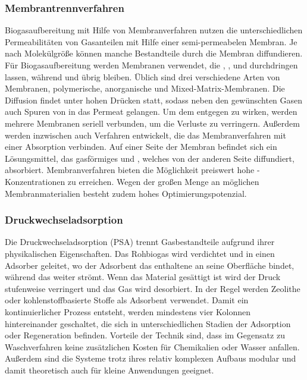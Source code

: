 \subsubsection{Membrantrennverfahren}\label{chap:membrane} 

Biogasaufbereitung mit Hilfe von Membranverfahren nutzen die unterschiedlichen Permeabilitäten von Gasanteilen mit Hilfe einer semi-permeabelen Membran. Je nach Molekülgröße können manche Bestandteile durch die Membran diffundieren. Für Biogasaufbereitung werden Membranen verwendet, die , ,  und  durchdringen lassen, während  und  übrig bleiben. Üblich sind drei verschiedene Arten von Membranen, polymerische, anorganische und Mixed-Matrix-Membranen. Die Diffusion findet unter hohen Drücken statt, sodass neben den gewünschten Gasen auch Spuren von  in das Permeat gelangen. Um dem entgegen zu wirken, werden mehrere Membranen seriell verbunden, um die Verluste zu verringern. Außerdem werden inzwischen auch Verfahren entwickelt, die das Membranverfahren mit einer Absorption verbinden. Auf einer Seite der Membran befindet sich ein Lösungsmittel, das gasförmiges  und , welches von der anderen Seite diffundiert, absorbiert. Membranverfahren bieten die Möglichkeit preiswert hohe -Konzentrationen zu erreichen. Wegen der großen Menge an möglichen Membranmaterialien besteht zudem hohes Optimierungspotenzial. \parencite{KGKK2019}


\subsubsection{Druckwechseladsorption}\label{chap:PSA}

Die Druckwechseladsorption (\gls{PSA}) trennt Gasbestandteile aufgrund ihrer physikalischen Eigenschaften. Das Rohbiogas wird verdichtet und in einen Adsorber geleitet, wo der Adsorbent das enthaltene  an seine Oberfläche bindet, während das  weiter strömt. Wenn das Material gesättigt ist wird der Druck stufenweise verringert und das Gas wird desorbiert. In der Regel werden Zeolithe oder kohlenstoffbasierte Stoffe als Adsorbent verwendet. Damit ein kontinuierlicher Prozess entsteht, werden mindestens vier Kolonnen hintereinander geschaltet, die sich in unterschiedlichen Stadien der Adsorption oder Regeneration befinden. Vorteile der Technik sind, dass im Gegensatz zu Waschverfahren keine zusätzlichen Kosten für Chemikalien oder Wasser anfallen. Außerdem sind die Systeme trotz ihres relativ komplexen Aufbaus modular und damit theoretisch auch für kleine Anwendungen geeignet. \parencite{BHPT13} \parencite{KGKK2019} 


